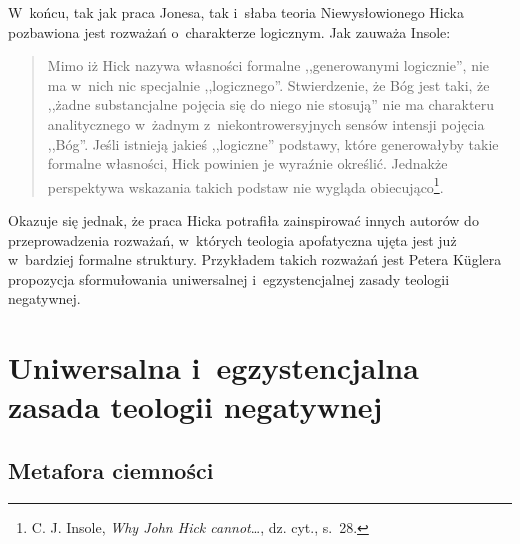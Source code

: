 W~końcu, tak jak praca Jonesa, tak i~słaba teoria Niewysłowionego Hicka pozbawiona jest rozważań o~charakterze logicznym. Jak zauważa Insole:

\begin{quote}
Mimo iż Hick nazywa własności formalne ,,generowanymi logicznie'', nie ma w~nich nic specjalnie ,,logicznego''. Stwierdzenie, że Bóg jest taki, że ,,żadne substancjalne pojęcia się do niego nie stosują'' nie ma charakteru analitycznego w~żadnym z~niekontrowersyjnych sensów intensji pojęcia ,,Bóg''. Jeśli istnieją jakieś ,,logiczne'' podstawy, które generowałyby takie formalne własności, Hick powinien je wyraźnie określić. Jednakże perspektywa wskazania takich podstaw nie wygląda obiecująco\footnote{C. J. Insole, \textit{Why John Hick cannot}\ldots, dz. cyt., s.~28.}.
\end{quote}
Okazuje się jednak, że praca Hicka potrafiła zainspirować innych autorów do przeprowadzenia rozważań, w~których teologia apofatyczna ujęta jest już w~bardziej formalne struktury. Przykładem takich rozważań jest Petera Küglera propozycja sformułowania uniwersalnej i~egzystencjalnej zasady teologii negatywnej.









\chapter{Uniwersalna i~egzystencjalna zasada teologii negatywnej}\label{sil-kugler}


\section{Metafora ciemności}

